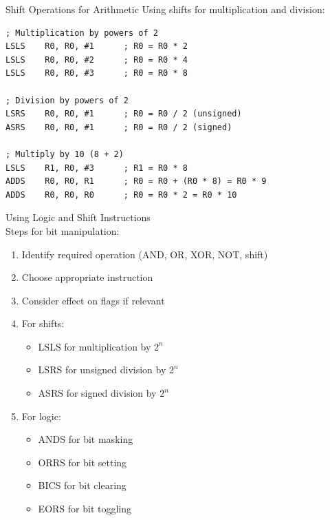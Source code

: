 \begin{example2}{Shift Operations for Arithmetic}
Using shifts for multiplication and division:
\begin{lstlisting}[language=armasm, style=basesmol]
; Multiplication by powers of 2
LSLS    R0, R0, #1      ; R0 = R0 * 2
LSLS    R0, R0, #2      ; R0 = R0 * 4
LSLS    R0, R0, #3      ; R0 = R0 * 8

; Division by powers of 2
LSRS    R0, R0, #1      ; R0 = R0 / 2 (unsigned)
ASRS    R0, R0, #1      ; R0 = R0 / 2 (signed)

; Multiply by 10 (8 + 2)
LSLS    R1, R0, #3      ; R1 = R0 * 8
ADDS    R0, R0, R1      ; R0 = R0 + (R0 * 8) = R0 * 9
ADDS    R0, R0, R0      ; R0 = R0 * 2 = R0 * 10
\end{lstlisting}
\end{example2}



\begin{KR}{Using Logic and Shift Instructions}\\
Steps for bit manipulation:
\begin{enumerate}
  \item Identify required operation (AND, OR, XOR, NOT, shift)
  \item Choose appropriate instruction
  \item Consider effect on flags if relevant
  \item For shifts:
    \begin{itemize}
      \item LSLS for multiplication by $2^n$
      \item LSRS for unsigned division by $2^n$
      \item ASRS for signed division by $2^n$
    \end{itemize}
  \item For logic:
    \begin{itemize}
      \item ANDS for bit masking
      \item ORRS for bit setting
      \item BICS for bit clearing
      \item EORS for bit toggling
    \end{itemize}
\end{enumerate}
\end{KR}

